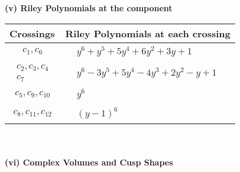 \documentclass[1p]{elsarticle_modified}
\theoremstyle{definition}
\begin{document}
\newpage\renewcommand{\arraystretch}{1}
\flushleft \textbf{(v) Riley Polynomials at the component}\newline \\
\begin{tabular}{m{50pt}|m{274pt}}
Crossings & \hspace{64pt}Riley Polynomials at each crossing \\
\hline $$\begin{aligned}c_{1},c_{6}\end{aligned}$$&$\begin{aligned}
&y^6+y^5+5 y^4+6 y^2+3 y+1
\end{aligned}$\\
\hline $$\begin{aligned}c_{2},c_{3},c_{4}\\c_{7}\end{aligned}$$&$\begin{aligned}
&y^6-3 y^5+5 y^4-4 y^3+2 y^2- y+1
\end{aligned}$\\
\hline $$\begin{aligned}c_{5},c_{9},c_{10}\end{aligned}$$&$\begin{aligned}
&y^6
\end{aligned}$\\
\hline $$\begin{aligned}c_{8},c_{11},c_{12}\end{aligned}$$&$\begin{aligned}
&(y-1)^6
\end{aligned}$\\
\hline
\end{tabular}\\~\\
\newpage\flushleft \textbf{(vi) Complex Volumes and Cusp Shapes}
\end{document}
